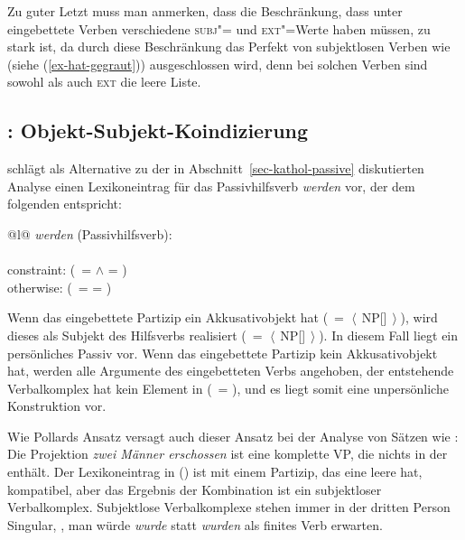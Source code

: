 {Zu guter Letzt muss man anmerken, dass die Beschränkung, dass unter \haben eingebettete
Verben verschiedene \textsc{subj}"= und \textsc{ext}"=Werte haben müssen, zu stark ist,
da durch diese Beschränkung das Perfekt von subjektlosen Verben
wie  (siehe (\ref{ex-hat-gegraut})) ausgeschlossen wird, denn bei solchen Verben sind
sowohl \subj als auch \textsc{ext} die leere Liste. 

\subsection{: Objekt-Subjekt-Koindizierung}
\label{sec-kathol-passive-raising}

\citet[]{Kathol94a} schlägt als Alternative zu der in Abschnitt~\ref{sec-kathol-passive} diskutierten Analyse einen Lexikoneintrag für
das Passivhilfsverb \emph{werden} vor, der dem folgenden entspricht:

\ea
\begin{tabular}[t]{@{}l@{}}
\emph{werden} (Passivhilfsverb):\\
\\[6mm]
constraint: (\, =  $\wedge$  = )\\[1mm]
otherwise: (\, =  = \eliste)
\end{tabular}
\z
Wenn das eingebettete Partizip ein Akkusativobjekt hat 
(\, = $\left\langle\right.$\,NP[]\,$\left.\right\rangle$), 
wird dieses als Subjekt des Hilfsverbs realisiert
(\, = $\left\langle\right.$\,NP[]\,$\left.\right\rangle$).
In diesem Fall liegt ein persönliches Passiv vor. Wenn das eingebettete Partizip kein Akkusativobjekt hat,
werden alle Argumente des eingebetteten Verbs  angehoben, der entstehende Verbalkomplex
hat kein Element in \subj (\, = \eliste), und es liegt somit eine unpersönliche Konstruktion vor.

Wie Pollards Ansatz versagt auch dieser Ansatz bei der Analyse von Sätzen
wie : Die Projektion \emph{zwei Männer
erschossen} ist eine komplette VP, die nichts in der \compsl enthält.
Der Lexikoneintrag in () ist mit einem Partizip, das eine leere \compsl hat, kompatibel,
aber das Ergebnis der Kombination ist ein subjektloser Verbalkomplex.
Subjektlose Verbalkomplexe stehen immer in der dritten Person Singular, 
\dash, man würde \emph{wurde} statt \emph{wurden} als finites Verb erwarten.

}

